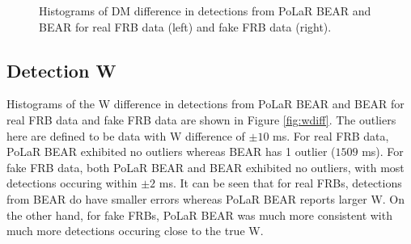 \begin{figure}
\begin{minipage}{0.5\textwidth}
    \end{minipage}
    \caption[Histograms of DM difference]{Histograms of DM difference in detections from PoLaR BEAR and BEAR for real FRB data (left) and fake FRB data (right).}
    \label{fig:dmdiff}
\end{figure}

\subsection{Detection W}

Histograms of the W difference in detections from PoLaR BEAR and BEAR for real FRB data and fake FRB data are shown in Figure \ref{fig:wdiff}. The outliers here are defined to be data with W difference of $\pm 10$ ms. For real FRB data, PoLaR BEAR exhibited no outliers whereas BEAR has 1 outlier ($1509$ ms). For fake FRB data, both PoLaR BEAR and BEAR exhibited no outliers, with most detections occuring within $\pm 2$ ms. It can be seen that for real FRBs, detections from BEAR do have smaller errors whereas PoLaR BEAR reports larger W. On the other hand, for fake FRBs, PoLaR BEAR was much more consistent with much more detections occuring close to the true W.

